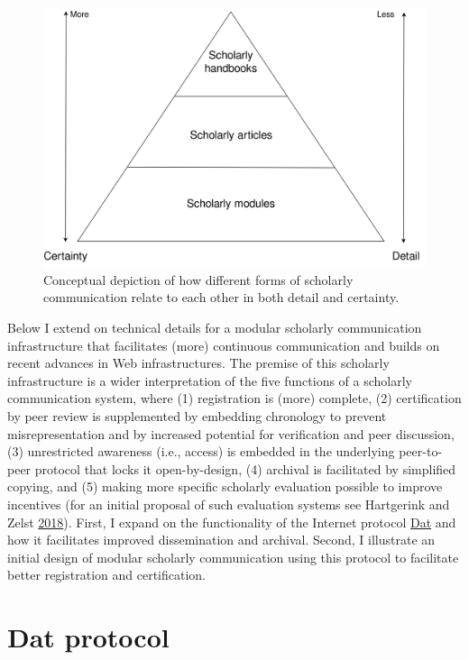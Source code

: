 \documentclass[a5paper]{book}
\begin{document}
\begin{figure}[h]

{\centering \includegraphics[width=0.8\linewidth]{assets/figures/datcom-fig1} 

}

\caption{Conceptual depiction of how different forms of scholarly communication relate to each other in both detail and certainty.}\label{fig:datcom-fig1}
\end{figure}

Below I extend on technical details for a modular scholarly
communication infrastructure that facilitates (more) continuous
communication and builds on recent advances in Web infrastructures. The
premise of this scholarly infrastructure is a wider interpretation of
the five functions of a scholarly communication system, where (1)
registration is (more) complete, (2) certification by peer review is
supplemented by embedding chronology to prevent misrepresentation and by
increased potential for verification and peer discussion, (3)
unrestricted awareness (i.e., access) is embedded in the underlying
peer-to-peer protocol that locks it open-by-design, (4) archival is
facilitated by simplified copying, and (5) making more specific
scholarly evaluation possible to improve incentives (for an initial
proposal of such evaluation systems see Hartgerink and Zelst
\protect\hyperlink{ref-doi:10.3390ux2fpublications6020021}{2018}).
First, I expand on the functionality of the Internet protocol
\href{https://datproject.org}{Dat} and how it facilitates improved
dissemination and archival. Second, I illustrate an initial design of
modular scholarly communication using this protocol to facilitate better
registration and certification.

\section{Dat protocol}\label{dat-protocol}
\end{document}
